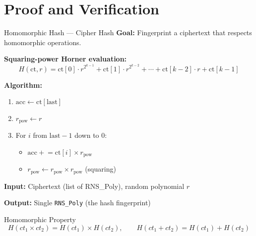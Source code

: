 \documentclass[aspectratio=169, 11pt]{beamer}
\begin{document}
\section{Proof and Verification}

\begin{frame}{Homomorphic Hash --- Cipher Hash}
\textbf{Goal:} Fingerprint a ciphertext that respects homomorphic operations.

\vspace{0.3em}
\textbf{Squaring-power Horner evaluation:}
\[
    H(\text{ct}, r) = \text{ct}[0] \cdot r^{2^{k-1}} + \text{ct}[1] \cdot r^{2^{k-2}} + \cdots + \text{ct}[k-2] \cdot r + \text{ct}[k-1]
\]

\textbf{Algorithm:}
\begin{enumerate}
    \item $\text{acc} \gets \text{ct}[\text{last}]$
    \item $r_{\text{pow}} \gets r$
    \item For $i$ from $\text{last}-1$ down to $0$:
    \begin{itemize}
        \item $\text{acc} \mathrel{+}= \text{ct}[i] \times r_{\text{pow}}$
        \item $r_{\text{pow}} \gets r_{\text{pow}} \times r_{\text{pow}}$ \quad (squaring)
    \end{itemize}
\end{enumerate}

\vspace{0.3em}
\textbf{Input:} Ciphertext (list of RNS\_Poly), random polynomial $r$

\textbf{Output:} Single \texttt{RNS\_Poly} (the hash fingerprint)

\vspace{0.3em}
\begin{block}{Homomorphic Property}
\[
    H(ct_1 \times ct_2) = H(ct_1) \times H(ct_2), \qquad
    H(ct_1 + ct_2) = H(ct_1) + H(ct_2)
\]
\end{block}
\end{frame}
\end{document}
